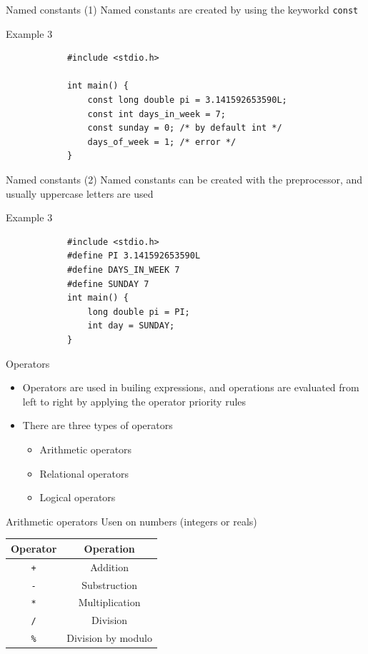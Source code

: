 \begin{frame}[fragile]{Named constants (1)}
\Large{Named constants are created by using the keyworkd \texttt{const}}
\begin{exampleblock}{Example 3}
        \begin{lstlisting}
            #include <stdio.h>

            int main() {
                const long double pi = 3.141592653590L;
                const int days_in_week = 7;
                const sunday = 0; /* by default int */
                days_of_week = 1; /* error */
            }
        \end{lstlisting}
    \end{exampleblock}
\end{frame}

\begin{frame}[fragile]{Named constants (2)}
Named constants can be created with the preprocessor, and usually
uppercase letters are used
    \begin{exampleblock}{Example 3}
        \begin{lstlisting}
            #include <stdio.h>
            #define PI 3.141592653590L
            #define DAYS_IN_WEEK 7
            #define SUNDAY 7        
            int main() {
                long double pi = PI;
                int day = SUNDAY;
            }
        \end{lstlisting}
    \end{exampleblock}
\end{frame}

\begin{frame}{Operators}
\begin{itemize}
\item Operators are used in builing expressions, and operations are
evaluated from left to right by applying the operator priority rules
\item There are three types of operators
\begin{itemize}
\item Arithmetic operators
\item Relational operators
\item Logical operators
\end{itemize}
\end{itemize}
\end{frame}

\begin{frame}{Arithmetic operators}
Usen on numbers (integers or reals)
\linebreak
\begin{center}
\begin{tabular}{c|c}
\textbf{Operator} & \textbf{Operation}\\
\hline
\texttt{+} & Addition \\
\texttt{-} & Substruction \\
\texttt{*} & Multiplication \\
\texttt{/} & Division \\
\texttt{\%} & Division by modulo
\end{tabular}
\end{center}
\end{frame}


